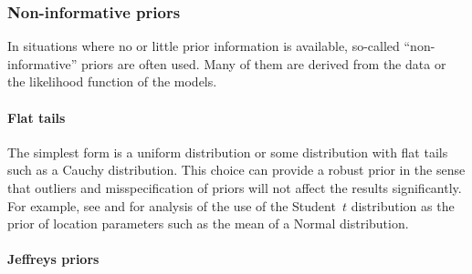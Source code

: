 \subsubsection{Non-informative priors}
\label{ssub:Non-informative priors}

In situations where no or little prior information is available, so-called
``non-informative'' priors are often used. Many of them are derived from the
data or the likelihood function of the models.

\paragraph{Flat tails}

The simplest form is a uniform distribution or some distribution with flat
tails such as a Cauchy distribution. This choice can provide a robust prior
in the sense that outliers and misspecification of priors will not affect the
results significantly. For example, see \cite{OHagan:1990vx} and
\cite{Fan:1992vx} for analysis of the use of the Student~$t$ distribution as
the prior of location parameters such as the mean of a Normal distribution.

\paragraph{Jeffreys priors}

